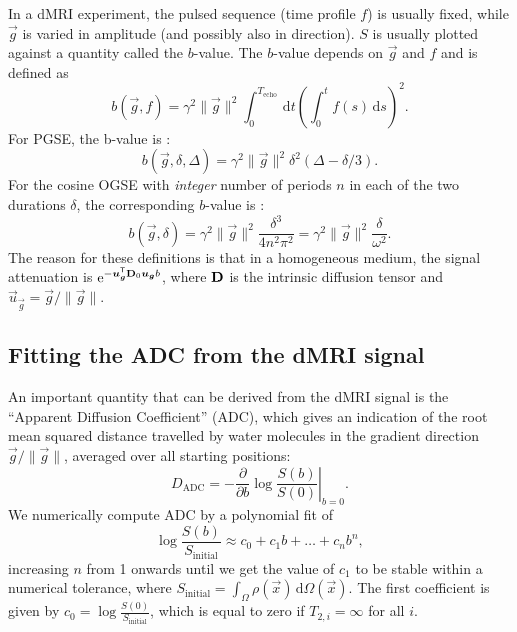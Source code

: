 \documentclass[a4paper]{article}
\begin{document}
In a dMRI experiment, the pulsed sequence (time profile $f$) is usually fixed, while $\vec{g}$ is varied in amplitude (and possibly also in direction). $S$ is usually plotted against a quantity called the $b$-value. The $b$-value depends on $\vec{g}$ and $f$ and is defined as
\begin{equation*}
    b(\vec{g}, f) = \gamma^2 \|\vec{g}\|^2 \int_0^{T_\text{echo}} \, \mathrm{d}t\left(\int_0^t f(s)\,\mathrm{d}s\right)^2.
\end{equation*}
For PGSE, the b-value is \cite{Stejskal1965}:
\begin{equation}
    b(\vec{g},\delta,\Delta) = \gamma^2 \|\vec{g}\|^2 \delta^2 \left(\Delta - \delta/3\right).
\end{equation}
For the cosine OGSE with \emph{integer}\/ number of periods $n$ in each of the two durations $\delta$, the corresponding $b$-value is \cite{Xu2007}:
\begin{equation}
    b(\vec{g},\delta) = \gamma^2 \|\vec{g}\|^2 \frac{\delta^3}{4 n^2 \pi^2} = \gamma^2 \|\vec{g}\|^2 \frac{\delta}{\omega^2}.
\end{equation}
The reason for these definitions is that in a homogeneous medium, the signal attenuation is $\mathrm{e}^{-\bm{u}_{\bm{g}}^{\mathsf{T}} \mathbf{D}_0 \bm{u}_{\bm{g}} b}$, where $\mathbf{D}$ is the intrinsic diffusion tensor and $\vec{u}_{\vec{g}} = \vec{g} / \|\vec{g}\|$.


\subsection{Fitting the ADC from the dMRI signal}

An important quantity that can be derived from the dMRI signal is the ``Apparent Diffusion Coefficient'' (ADC), which gives an indication of the root mean squared distance travelled by water molecules in the gradient direction $\vec{g}/\|\vec{g}\|$, averaged over all starting positions:
\begin{equation}\label{eq:ADCdef}
    D_\text{ADC} = \left. -\frac{\partial}{\partial b} \log{\frac{S(b)}{S(0)}}\right\vert_{b=0}.
\end{equation}
We numerically compute ADC by a polynomial fit of
$$\log\frac{S(b)}{S_\text{initial}} \approx c_0+c_1b+\dots+c_n b^n,$$
increasing $n$ from 1 onwards until we get the value of $c_1$ to be stable within a numerical tolerance, where $S_\text{initial} = \int_\Omega \rho(\vec{x}) \, \mathrm{d} \Omega(\vec{x})$. The first coefficient is given by $c_0 = \log \frac{S(0)}{S_\text{initial}}$, which is equal to zero if $T_{2,i} = \infty$ for all $i$.
\end{document}
